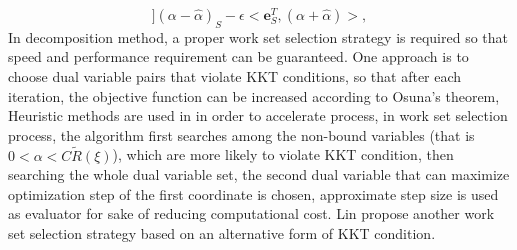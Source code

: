 \documentclass[12pt, draftclsnofoot, onecolumn]{IEEEtran}
\begin{document}
\begin{spacing}{2}
\begin{equation}
](\alpha-\hat{\alpha})_{S}-\epsilon<\mathbf{e}_{S}^{T}, (\alpha+\hat{\alpha})>,
\label{subset optimization}
\end{equation}
In decomposition method, a proper work set selection strategy is required so that speed and performance requirement can be guaranteed. One approach is to choose dual variable pairs that violate KKT conditions, so that after each iteration, the objective function can be increased according to Osuna's theorem\cite{osuna1997improved}, Heuristic methods are used in in order to accelerate process, in work set selection process, the algorithm first searches among the non-bound variables (that is $0<\alpha<C\tilde{R}(\xi)$), which are more likely to violate KKT condition, then searching the whole dual variable set, the second dual variable that can maximize optimization step of the first coordinate is chosen, approximate step size is used as evaluator for sake of reducing computational cost. Lin propose another work set selection strategy based on an alternative form of KKT condition.


\end{spacing}
\end{document}
